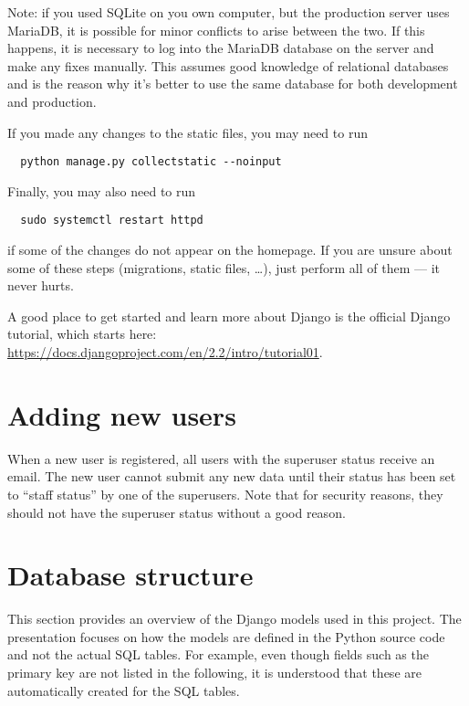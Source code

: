 \documentclass{article}
\begin{document}
Note: if you used SQLite on you own computer, but the production server uses MariaDB, it is possible for minor conflicts to arise between the two. If this happens, it is necessary to log into the MariaDB database on the server and make any fixes manually. This assumes good knowledge of relational databases and is the reason why it's better to use the same database for both development and production.

If you made any changes to the static files, you may need to run
\begin{lstlisting}
  python manage.py collectstatic --noinput
\end{lstlisting}
Finally, you may also need to run
\begin{lstlisting}
  sudo systemctl restart httpd
\end{lstlisting}
if some of the changes do not appear on the homepage. If you are unsure about some of these steps (migrations, static files, \ldots), just perform all of them --- it never hurts.

A good place to get started and learn more about Django is the official Django tutorial, which starts here: \url{https://docs.djangoproject.com/en/2.2/intro/tutorial01}.

\section{Adding new users}

When a new user is registered, all users with the superuser status receive an email. The new user cannot submit any new data until their status has been set to ``staff status'' by one of the superusers. Note that for security reasons, they should not have the superuser status without a good reason.

\section{Database structure}

This section provides an overview of the Django models used in this project. The presentation focuses on how the models are defined in the Python source code and not the actual SQL tables. For example, even though fields such as the primary key are not listed in the following, it is understood that these are automatically created for the SQL tables.
\end{document}
